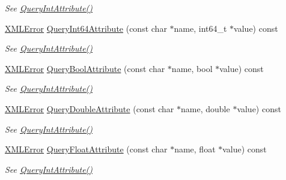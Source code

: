 \begin{DoxyCompactItemize}
\begin{DoxyCompactList}\small\item\em See \hyperlink{classtinyxml2_1_1_x_m_l_element_a8a78bc1187c1c45ad89f2690eab567b1}{Query\+Int\+Attribute()} \end{DoxyCompactList}\item 
\hyperlink{namespacetinyxml2_a1fbf88509c3ac88c09117b1947414e08}{X\+M\+L\+Error} \hyperlink{classtinyxml2_1_1_x_m_l_element_a7c0955d80b6f8d196744eacb0f6e90a8}{Query\+Int64\+Attribute} (const char $\ast$name, int64\+\_\+t $\ast$value) const
\begin{DoxyCompactList}\small\item\em See \hyperlink{classtinyxml2_1_1_x_m_l_element_a8a78bc1187c1c45ad89f2690eab567b1}{Query\+Int\+Attribute()} \end{DoxyCompactList}\item 
\hyperlink{namespacetinyxml2_a1fbf88509c3ac88c09117b1947414e08}{X\+M\+L\+Error} \hyperlink{classtinyxml2_1_1_x_m_l_element_a14c1bb77c39689838be01838d86ca872}{Query\+Bool\+Attribute} (const char $\ast$name, bool $\ast$value) const
\begin{DoxyCompactList}\small\item\em See \hyperlink{classtinyxml2_1_1_x_m_l_element_a8a78bc1187c1c45ad89f2690eab567b1}{Query\+Int\+Attribute()} \end{DoxyCompactList}\item 
\hyperlink{namespacetinyxml2_a1fbf88509c3ac88c09117b1947414e08}{X\+M\+L\+Error} \hyperlink{classtinyxml2_1_1_x_m_l_element_a5f0964e2dbd8e2ee7fce9beab689443c}{Query\+Double\+Attribute} (const char $\ast$name, double $\ast$value) const
\begin{DoxyCompactList}\small\item\em See \hyperlink{classtinyxml2_1_1_x_m_l_element_a8a78bc1187c1c45ad89f2690eab567b1}{Query\+Int\+Attribute()} \end{DoxyCompactList}\item 
\hyperlink{namespacetinyxml2_a1fbf88509c3ac88c09117b1947414e08}{X\+M\+L\+Error} \hyperlink{classtinyxml2_1_1_x_m_l_element_acd5eeddf6002ef90806af794b9d9a5a5}{Query\+Float\+Attribute} (const char $\ast$name, float $\ast$value) const
\begin{DoxyCompactList}\small\item\em See \hyperlink{classtinyxml2_1_1_x_m_l_element_a8a78bc1187c1c45ad89f2690eab567b1}{Query\+Int\+Attribute()} \end{DoxyCompactList}\item 

\end{DoxyCompactItemize}
